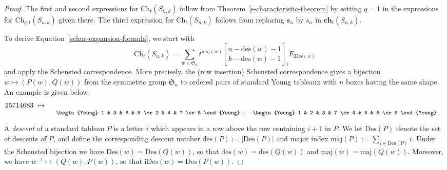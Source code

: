 \documentclass[ALCO,ThmDefs,published]{cedram}
\newcommand{\symm}{{\mathfrak{S}}}
\theoremstyle{plain}
\newcommand{\maj}{{\mathrm {maj}}}
\newcommand{\Des}{{\mathrm {Des}}}
\newcommand{\des}{{\mathrm {des}}}
\newcommand{\Ch}{{\mathrm {Ch}}}
\newcommand{\ch}{{\mathbf {ch}}}
\newcommand{\iDes}{{\mathrm {iDes}}}
\newcommand{\symm}{{\mathfrak{S}}}
\newcommand{\sss}{{\mathbf{s}}}
\begin{document}
\begin{proof}
The first and second expressions for $\Ch_t(S_{n,k})$ follow from Theorem~\ref{s-characteristic-theorem}
by setting $q = 1$ in the expressions for $\Ch_{q,t}(S_{n,k})$ given there.  The third expression for 
$\Ch_t(S_{n,k})$ follows from replacing $\sss_{\alpha}$ by $s_{\alpha}$ in $\ch_t(S_{n,k})$.

To derive Equation~\eqref{schur-expansion-formula}, we start with 
\[
\Ch_t(S_{n,k}) = \sum_{w \in \symm_n}  t^{\maj(w)} {n - \des(w) - 1 \brack k - \des(w) - 1}_t F_{\iDes(w)}
\]
and apply the Schensted correspondence.  More precisely, the (row insertion)
Schensted correspondence gives a bijection
$w \mapsto (P(w), Q(w))$ from the symmetric group $\symm_n$ to ordered pairs of standard Young tableaux
with $n$ boxes having the same shape.  
An example is given below.
\begin{equation*}
25714683 \, \,  \mapsto \, \, \, \,
\raisebox{-10pt}{
\begin{footnotesize}
\begin{Young}
 1 & 3 & 6 & 8 \cr
 2 & 4 & 7 \cr
 5 
\end{Young} \,, \, \,
\begin{Young}
1 & 2 & 3 & 7 \cr
4 & 5 & 6 \cr
8 
\end{Young} \, 
\end{footnotesize} }
\end{equation*}

A \emph{descent} of a standard tableau $P$ is a letter $i$ which appears in a row above 
the row containing $i+1$ in $P$.
We let $\Des(P)$ denote the set of descents of $P$, and define the corresponding descent number
$\des(P) := |\Des(P)|$ and major index $\maj(P) := \sum_{i \in \Des(P)} i$.
Under the Schensted  bijection we have
$\Des(w) = \Des(Q(w))$, so that  $\des(w) = \des(Q(w))$ and $\maj(w) = \maj(Q(w))$.
Moreover, we have $w^{-1} \mapsto (Q(w), P(w))$, so that $\iDes(w) = \Des(P(w))$.


\end{proof}
\end{document}
